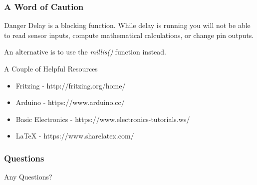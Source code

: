 \documentclass[serif,mathserif, 12pt]{beamer}
\begin{document}
\begin{frame}
    \frametitle{A Word of Caution}
    \begin{alertblock}{Danger}
    Delay is a blocking function. While delay is running you will not
    be able to read sensor inputs, compute mathematical calculations, or
    change pin outputs.
    
    An alternative is to use the \textit{millis()} function instead.
    \end{alertblock}
\end{frame}

\begin{frame}{A Couple of Helpful Resources}
    \begin{itemize}
        \item Fritzing - http://fritzing.org/home/
        \item Arduino - https://www.arduino.cc/
        \item Basic Electronics - https://www.electronics-tutorials.ws/
        \item \LaTeX{} - https://www.sharelatex.com/
    \end{itemize}
\end{frame}

\begin{frame}
  \frametitle{Questions}
  \centering Any Questions?
\end{frame}
\end{document}
